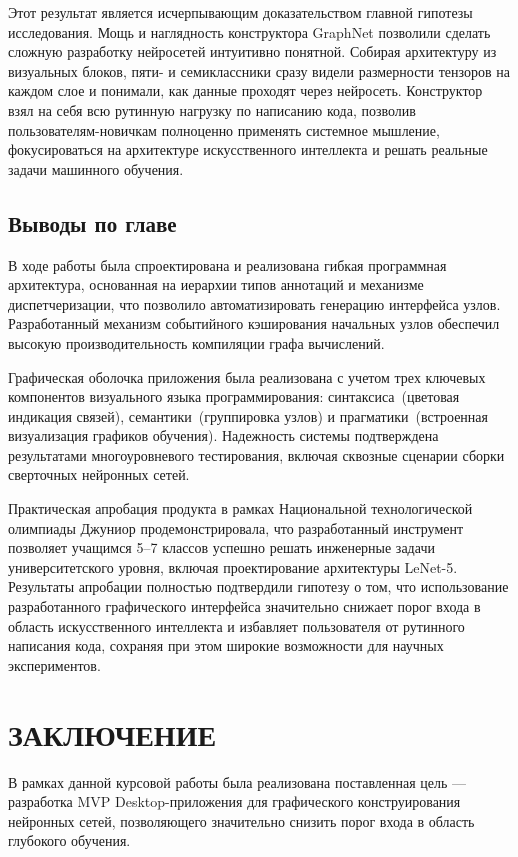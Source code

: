 \documentclass{report}
\begin{document}
Этот результат является исчерпывающим доказательством главной гипотезы исследования. Мощь и наглядность конструктора GraphNet позволили сделать сложную разработку нейросетей интуитивно понятной. Собирая архитектуру из визуальных блоков, пяти- и семиклассники сразу видели размерности тензоров на каждом слое и понимали, как данные проходят через нейросеть. Конструктор взял на себя всю рутинную нагрузку по написанию кода, позволив пользователям-новичкам полноценно применять системное мышление, фокусироваться на архитектуре искусственного интеллекта и решать реальные задачи машинного обучения.


\section*{Выводы по главе}
В ходе работы была спроектирована и реализована гибкая программная архитектура, основанная на иерархии типов аннотаций и механизме диспетчеризации, что позволило автоматизировать генерацию интерфейса узлов. Разработанный механизм событийного кэширования начальных узлов обеспечил высокую производительность компиляции графа вычислений.

Графическая оболочка приложения была реализована с учетом трех ключевых компонентов визуального языка программирования: синтаксиса~(цветовая индикация связей), семантики~(группировка узлов) и прагматики~(встроенная визуализация графиков обучения). Надежность системы подтверждена результатами многоуровневого тестирования, включая сквозные сценарии сборки сверточных нейронных сетей.

Практическая апробация продукта в рамках Национальной технологической олимпиады Джуниор продемонстрировала, что разработанный инструмент позволяет учащимся 5–7 классов успешно решать инженерные задачи университетского уровня, включая проектирование архитектуры LeNet-5. Результаты апробации полностью подтвердили гипотезу о том, что использование разработанного графического интерфейса значительно снижает порог входа в область искусственного интеллекта и избавляет пользователя от рутинного написания кода, сохраняя при этом широкие возможности для научных экспериментов.

\chapter*{ЗАКЛЮЧЕНИЕ}

В рамках данной курсовой работы была реализована поставленная цель — разработка MVP Desktop-приложения для графического конструирования нейронных сетей, позволяющего значительно снизить порог входа в область глубокого обучения.
\end{document}
